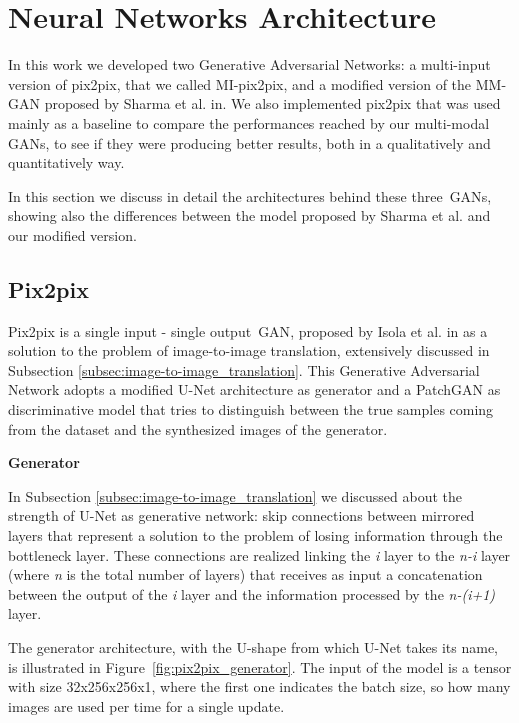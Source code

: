 \section{Neural Networks Architecture}
\label{sec:nn_architecture}
In this work we developed two Generative Adversarial Networks: a multi-input version of pix2pix\cite{pix2pix}, that we called MI-pix2pix, and a modified version of the MM-GAN proposed by Sharma et al. in\cite{migan}.
We also implemented pix2pix that was used mainly as a baseline to compare the performances reached by our multi-modal \ac{GAN}s, to see if they were producing better results, both in a qualitatively and quantitatively way.

\vspace{2mm} %
In this section we discuss in detail the architectures behind these three~\ac{GAN}s, showing also the differences between the model proposed by Sharma et al. and our modified version.

\subsection{Pix2pix}
\label{subsec:pix2pix_architecture}
Pix2pix is a single input - single output~\ac{GAN}, proposed by Isola et al. in \cite{pix2pix} as a solution to the problem of image-to-image translation, extensively discussed in Subsection \ref{subsec:image-to-image_translation}.
This Generative Adversarial Network adopts a modified U-Net architecture\cite{unet} as generator and a PatchGAN\cite{patchgan} as discriminative model that tries to distinguish between the true samples coming from the dataset and the synthesized images of the generator.

\vspace{6mm} 
\noindent\textbf{Generator}

\vspace{2mm}
\noindent In Subsection \ref{subsec:image-to-image_translation} we discussed about the strength of U-Net as generative network: skip connections between mirrored layers that represent a solution to the problem of losing information through the bottleneck layer. These connections are realized linking the \textit{i} layer to the \textit{n-i} layer (where \textit{n} is the total number of layers) that receives as input a concatenation between the output of the \textit{i} layer and the information processed by the \textit{n-(i+1)} layer.

\vspace{2mm} %
The generator architecture, with the U-shape from which U-Net takes its name, is illustrated in Figure~\ref{fig:pix2pix_generator}. The input of the model is a tensor with size 32x256x256x1, where the first one indicates the batch size, so how many images are used per time for a single update. 

